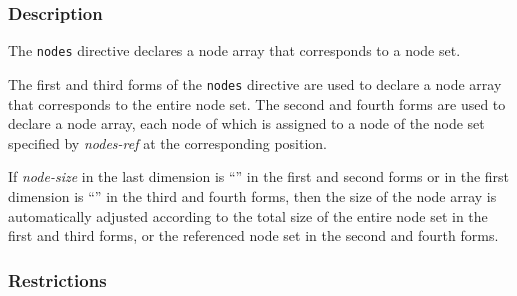 \subsubsection*{Description}

The {\tt nodes} directive declares a node array that corresponds to a
node set.

The first and third forms of the {\tt nodes} directive are used to declare a node
array that corresponds to the entire node set.
The second and fourth forms are used to declare a node array, each node of which is
assigned to a node of the node set specified by {\it nodes-ref} at the
corresponding position.

%

If {\it node-size} in the last dimension is ``{\tt *}'' in the first and second forms
or in the first dimension is ``{\tt *}'' in the third and fourth forms, then the size
of the node array is automatically adjusted according to the total size
of the entire node set in the first and third forms, 
or the referenced node set in the second and fourth forms.

\subsubsection*{Restrictions}

